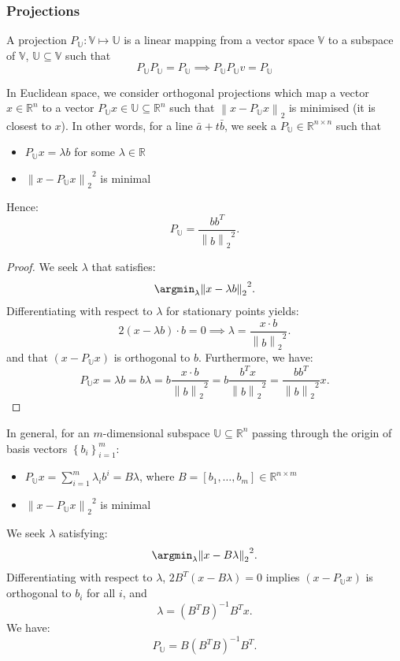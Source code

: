 \subsubsection{Projections}
\begin{definition}[Projection]
  A projection $P_\mathbb{U}: \mathbb{V}\mapsto \mathbb{U}$ is a linear mapping
  from a vector space $\mathbb{V}$ to a subspace of $\mathbb{V}$,
  $\mathbb{U}\subseteq \mathbb{V}$ such that
  \[P_\mathbb{U}P_\mathbb{U}=P_\mathbb{U}\implies P_\mathbb{U}P_\mathbb{U}v=P_\mathbb{U}\]
\end{definition}
\begin{example}
  In Euclidean space, we consider orthogonal projections which map a vector
  $x\in \mathbb{R}^{n}$ to a vector $P_\mathbb{U}x\in \mathbb{U}\subseteq
  \mathbb{R}^{n}$ such that $\left \lVert x-P_\mathbb{U}x \right \rVert_2 $ is
  minimised (it is closest to $x$). In other words, for a line $\bar{a}+t
  \bar{b}$, we seek a $P_\mathbb{U}\in \mathbb{R}^{n\times n}$ such that
  \begin{itemize}
    \item $P_\mathbb{U}x=\lambda b$ for some $\lambda\in \mathbb{R}$
    \item ${\left \lVert x-P_\mathbb{U}x \right \rVert_2} ^{2}$ is minimal
  \end{itemize}
  Hence:
  \[P_\mathbb{U}=\frac{b{b}^{T}}{{\left \lVert b \right \rVert_2} ^2}.\]
\end{example}
\begin{proof}
  We seek $\lambda$ that satisfies:
  \[\argmin_\lambda{{\left \lVert x-\lambda b \right \rVert_2}^{2} }.\] 
  Differentiating with respect to $\lambda$ for stationary points yields:
  \[2(x-\lambda b)\cdot b=0 \implies \lambda=\frac{x\cdot b}{{\left \lVert b \right \rVert_2}^{2} }.\] 
  and that $(x-P_\mathbb{U}x)$ is orthogonal to $b$.
  Furthermore, we have:
  \[P_\mathbb{U}x=\lambda b=b\lambda=b\frac{x\cdot b}{{\left \lVert b
  \right\rVert_2}^2 }=b\frac{b^{T}x}{{\left \lVert b
\right\rVert_2}^{2}}=\frac{b{b}^{T}}{{\left \lVert b \right \rVert_2 }^{2}}x.\] 
\end{proof}
\begin{example}
  In general, for an $m$-dimensional subspace $\mathbb{U}\subseteq
  \mathbb{R}^{n}$ passing through the origin of basis vectors $\left\{ b_i
  \right\} _{i=1}^m$:
  \begin{itemize}
    \item $P_\mathbb{U}x=\sum_{i=1}^{m} \lambda_i b^i=B\lambda$, where $B=\left[
      b_1,\ldots,b_m \right]\in \mathbb{R}^{n\times m}$
    \item ${\left \lVert x-P_\mathbb{U}x \right \rVert_2 }^{2}$ is minimal
  \end{itemize}
  We seek $\lambda$ satisfying:
  \[\argmin_\lambda{{\left \lVert x-B\lambda \right \rVert_2 }^{2}}.\]
  Differentiating with respect to $\lambda$, $2B^{T}(x-B\lambda)=0$ implies
  $(x-P_\mathbb{U}x)$ is orthogonal to $b_i$ for all $i $, and
  \[\lambda={(B^{T}B)}^{-1}B^{T}x.\] 
  We have:
  \[P_\mathbb{U}=B{(B^{T}B)}^{-1}B^{T}.\] 
\end{example}

